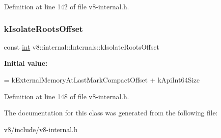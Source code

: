 Definition at line 142 of file v8-\/internal.\+h.

\mbox{\label{classv8_1_1internal_1_1Internals_a3142f942a25203ce7fca0e9a4563c74d}} 
\subsubsection{\texorpdfstring{k\+Isolate\+Roots\+Offset}{kIsolateRootsOffset}}
{\footnotesize\ttfamily const \mbox{\hyperlink{classint}{int}} v8\+::internal\+::\+Internals\+::k\+Isolate\+Roots\+Offset\hspace{0.3cm}{\ttfamily [static]}}

{\bfseries Initial value\+:}
\begin{DoxyCode}
=
      kExternalMemoryAtLastMarkCompactOffset + kApiInt64Size
\end{DoxyCode}


Definition at line 148 of file v8-\/internal.\+h.



The documentation for this class was generated from the following file\+:\begin{DoxyCompactItemize}
\item 
v8/include/v8-\/internal.\+h\end{DoxyCompactItemize}
